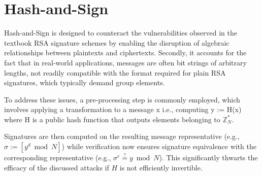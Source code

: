 \documentclass[]{final_report}
\theoremstyle{definition}
\newtheorem{definition}{Definition}[chapter]
\begin{document}
\section{Hash-and-Sign}
\label{def:hashed rsa}
Hash-and-Sign is designed to counteract the vulnerabilities observed in the textbook RSA signature schemes by enabling the disruption of algebraic relationships between plaintexts and ciphertexts. Secondly, it accounts for the fact that in real-world applications, messages are often bit strings of arbitrary lengths, not readily compatible with the format required for plain RSA signatures, which typically demand group elements.

To address these issues, a pre-processing step is commonly employed, which involves applying a transformation to a message x i.e., computing y := H(x) where H is a public hash function that outputs elements belonging to $\mathbb{Z}^{*}_{N}$.

Signatures are then computed on the resulting message representative (e.g., $\sigma := [y^d \bmod N]$) while verification now ensures signature equivalence with the corresponding representative (e.g., $\sigma^e \stackrel{?}{=} y \bmod N$). This significantly thwarts the efficacy of the discussed attacks if \( H \) is not efficiently invertible.

\end{document}
